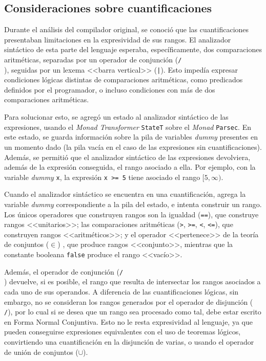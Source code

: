 \subsection{Consideraciones sobre cuantificaciones}

Durante el análisis del compilador original, se conoció que las cuantificaciones
presentaban limitaciones en la expresividad de sus rangos. El analizador
sintáctico de esta parte del lenguaje esperaba, específicamente, dos
comparaciones aritméticas, separadas por un operador de conjunción
(\texttt{/\\}), seguidas por un lexema <<barra vertical>> (\texttt{|}). Esto
impedía expresar condiciones lógicas distintas de comparaciones aritméticas,
como predicados definidos por el programador, o incluso condiciones con más de
dos comparaciones aritméticas.

Para solucionar esto, se agregó un estado al analizador sintáctico de las
expresiones, usando el \emph{Monad Transformer} \texttt{StateT} sobre el
\emph{Monad} \texttt{Parsec}. En este estado, se guarda información sobre la
pila de variables \emph{dummy} presentes en un momento dado (la pila vacía en el
caso de las expresiones sin cuantificaciones). Además, se permitió que el
analizador sintáctico de las expresiones devolviera, además de la expresión
conseguida, el rango asociado a ella. Por ejemplo, con la variable \emph{dummy}
\texttt{x}, la expresión \texttt{x >= 5} tiene asociado el rango $[5, \infty)$.

Cuando el analizador sintáctico se encuentra en una cuantificación, agrega la
variable \emph{dummy} correspondiente a la pila del estado, e intenta construir
un rango. Los únicos operadores que construyen rangos son la igualdad
(\texttt{==}), que construye rangos <<unitarios>>; las comparaciones aritméticas
(\texttt{>}, \texttt{>=}, \texttt{<}, \texttt{<=}), que construyen rangos
<<aritméticos>>; y el operador <<pertenece>> de la teoría de conjuntos ($\in$)
, que produce rangos <<conjunto>>, mientras que la
constante booleana \texttt{false} produce el rango <<vacío>>. 

Además, el operador de conjunción (\texttt{/\\}) devuelve, si es posible, el
rango que resulta de intersectar los rangos asociados a cada uno de sus
operandos. A diferencia de las cuantificaciones lógicas, sin embargo, no se
consideran los rangos generados por el operador de disjunción (\texttt{\\/}),
por lo cual si se desea que un rango sea procesado como tal, debe estar escrito
en Forma Normal Conjuntiva. Esto no le resta expresividad al lenguaje, ya que
pueden conseguirse expresiones equivalentes con el uso de teoremas lógicos,
convirtiendo una cuantificación en la disjunción de varias, o usando el operador
de unión de conjuntos ($\cup$).

